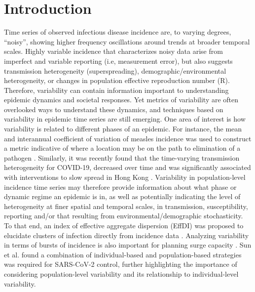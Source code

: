 \documentclass[10pt,letterpaper]{article}
\begin{document}
\linenumbers

\section*{Introduction}
Time series of observed infectious disease incidence are, to varying degrees, ``noisy'', showing higher frequency oscillations around trends at broader temporal scales.
Highly variable incidence that characterizes noisy data arise from imperfect and variable reporting (i.e, measurement error), but also suggests transmission heterogeneity (superspreading), demographic/environmental heterogeneity, or changes in population effective reproduction number (R).
Therefore, variability can contain information important to understanding epidemic dynamics and societal responses. 
Yet metrics of variability are often overlooked ways to understand these dynamics, and techniques based on variability in epidemic time series are still emerging. 
One area of interest is how variability is related to different phases of an epidemic. 
For instance, the mean and interannual coefficient of variation of measles incidence was used to construct a metric indicative of where a location may be on the path to elimination of a pathogen \cite{graham_measles_2019}. 
Similarly, it was recently found that the time-varying transmission heterogeneity for COVID-19, decreased over time and was significantly associated with interventions to slow spread in Hong Kong \cite{adam_time-varying_2022}. 
Variability in population-level incidence time series may therefore provide information about what phase or dynamic regime an epidemic is in, as well as potentially indicating the level of heterogeneity at finer spatial and temporal scales, in transmission, susceptibility, reporting and/or that resulting from environmental/demographic stochasticity. 
To that end, an index of effective aggregate dispersion (EffDI) was proposed to elucidate clusters of infection directly from incidence data \cite{schneckenreither_assessing_2023}. 
Analyzing variability in terms of bursts of incidence is also important for planning surge capacity \cite{wallinga_metropolitan_2018}. 
Sun et al. \cite{sun_transmission_2021} found a combination of individual-based and population-based strategies was required for SARS-CoV-2 control, further highlighting the importance of considering population-level variability and its relationship to individual-level variability.
\end{document}
